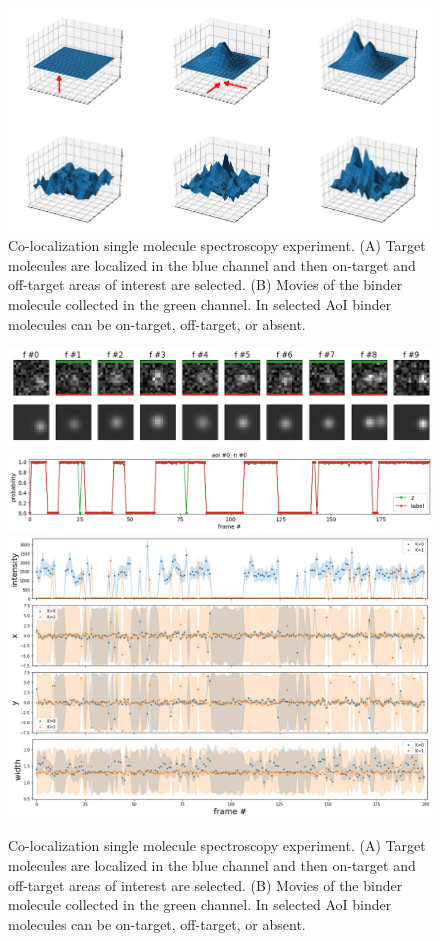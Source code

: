 \begin{figure}
\includegraphics[width=\linewidth]{figures/figure2.png}
\caption{Co-localization single molecule spectroscopy experiment. (A) Target molecules are localized in the blue channel and then on-target and off-target areas of interest are selected. (B) Movies of the binder molecule collected in the green channel. In selected AoI binder molecules can be on-target, off-target, or absent.}
\label{fig:model}
\end{figure}

\begin{figure}
\includegraphics[width=\linewidth]{figures/figure3a.png}
\includegraphics[width=\linewidth]{figures/figure3b.png}
\includegraphics[width=\linewidth]{figures/figure3c.png}
\caption{Co-localization single molecule spectroscopy experiment. (A) Target molecules are localized in the blue channel and then on-target and off-target areas of interest are selected. (B) Movies of the binder molecule collected in the green channel. In selected AoI binder molecules can be on-target, off-target, or absent.}
\label{fig:view}
\end{figure}

